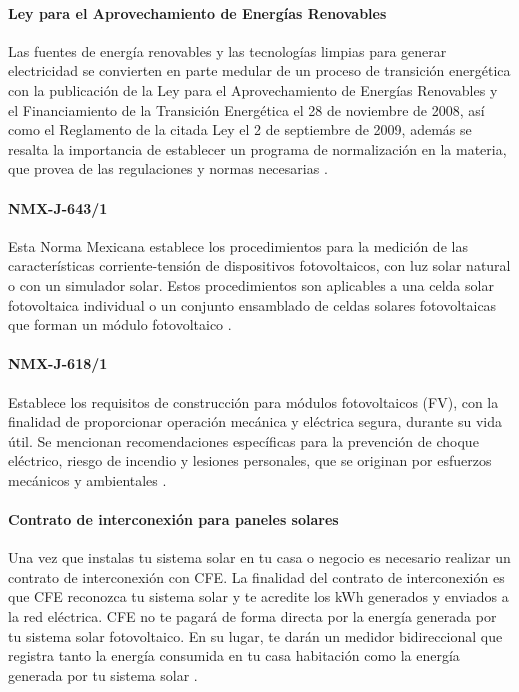 \paragraph{Ley para el Aprovechamiento de Energías Renovables}
Las fuentes de energía renovables y las tecnologías limpias para generar electricidad se convierten en parte medular de un proceso de transición energética con la publicación de la
Ley para el Aprovechamiento de Energías Renovables y el Financiamiento de la Transición
Energética el 28 de noviembre de 2008, así como el Reglamento de la citada Ley el 2 de septiembre de 2009, además se resalta la importancia de establecer un programa de normalización en la
materia, que provea de las regulaciones y normas necesarias \citep{LeyAprovechamiento}.



\paragraph{NMX-J-643/1}
Esta Norma Mexicana establece los procedimientos para la medición de las
características corriente-tensión de dispositivos fotovoltaicos,
con luz solar natural o con un simulador solar. Estos
procedimientos son aplicables a una celda solar fotovoltaica
individual o un conjunto ensamblado de celdas solares
fotovoltaicas que forman un módulo fotovoltaico \citep{NMX-J-643/1}.

\paragraph{NMX-J-618/1}
Establece los requisitos de construcción para módulos fotovoltaicos (FV), con la finalidad de proporcionar operación mecánica y eléctrica segura, durante su vida útil. Se mencionan recomendaciones específicas para la prevención de choque eléctrico, riesgo de incendio y lesiones personales, que se originan por esfuerzos mecánicos y ambientales \citep{NMX-J-618/1}.

\paragraph{Contrato de interconexión para paneles solares}

Una vez que instalas tu sistema solar en tu casa o negocio es necesario realizar un contrato de interconexión con CFE. La finalidad del contrato de interconexión es que CFE reconozca tu sistema solar y te acredite los kWh generados y enviados a la red eléctrica. CFE no te pagará de forma directa por la energía generada por tu sistema solar fotovoltaico. En su lugar, te darán un medidor bidireccional que registra tanto la energía consumida en tu casa habitación como la energía generada por tu sistema solar \citep{ContratoSolar}.
